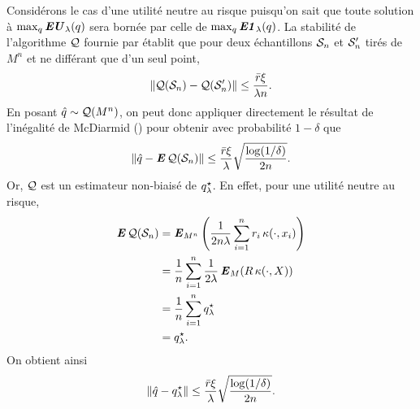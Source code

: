 \begin{lemme}
  \label{b:lem:qhnorm}
  Considérons le cas d'une utilité neutre au risque puisqu'on sait que toute solution à
  $\max_q\EU_\lambda(q)$ sera bornée par celle de $\max_q\EN_\lambda(q)$.  La stabilité de
  l'algorithme $\alg$ fournie par \cite{bousquet2002stability} établit que pour deux
  échantillons $\S_n$ et $\S_n'$ tirés de $M^n$ et ne différant que d'un seul point,
  \begin{equation}
    \|\alg(\S_n) - \alg(\S'_n)\| \leq \frac{\rmax\xi}{\lambda n}.
  \end{equation}
  En posant $\qh \sim \alg(M^n)$, on peut donc appliquer directement le résultat de
  l'inégalité de McDiarmid () pour obtenir avec probabilité
  $1-\delta$ que
  \begin{equation}
    \|\qh - \E\alg(\S_n)\| \leq \frac{\rmax\xi}{\lambda}\sqrt{\frac{\log(1/\delta)}{2n}}.
  \end{equation}
  Or, $\alg$ est un estimateur non-biaisé de $\qsl$. En effet, pour une utilité neutre au
  risque,
  \begin{align}
    \E\alg(\S_n) &= \E_{M^n}\left(\frac{1}{2n\lambda}\sumi r_i\,\kappa(\cdot,x_i)\right)\\
                 & =\frac{1}{n}\sumi \frac{1}{2\lambda}\E_M(R\,\kappa(\cdot,X))\\
                 & =\frac{1}{n}\sumi \qsl\\
                 &=\qsl.
  \end{align}
  On obtient ainsi
  \begin{equation}
    \|\qh - \qsl\| \leq \frac{\rmax\xi}{\lambda}\sqrt{\frac{\log(1/\delta)}{2n}}.
  \end{equation}
\end{lemme}

